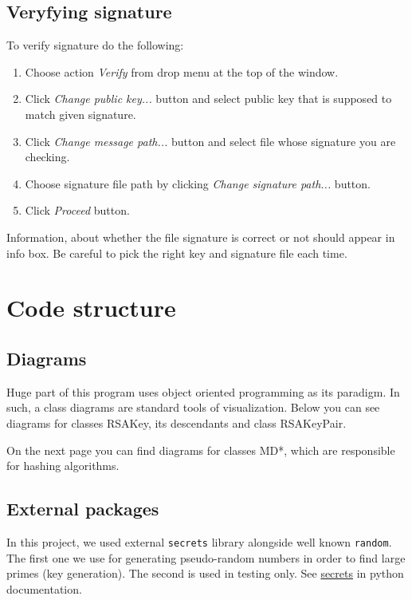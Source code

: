 \documentclass[letterpaper,10pt,english]{sphinxmanual}
\begin{document}
\section{Veryfying signature}
To verify signature do the following:
\begin{enumerate}
    \item Choose action {\em Verify} from drop menu at the top of the window.
    \item Click {\em Change public key...} button and select public key that is supposed
        to match given signature.
    \item Click {\em Change message path...} button and select file whose signature you are checking.
    \item Choose signature file path by clicking {\em Change signature path...} button.
    \item Click {\em Proceed} button.
\end{enumerate}
Information, about whether the file signature is correct or not should appear in
info box. Be careful to pick the right key and signature file each time.

\chapter{Code structure}

\section{Diagrams}
\vspace{1em}
Huge part of this program uses object oriented programming
as its paradigm. In such, a class diagrams are standard tools
of visualization. Below you can see diagrams for classes
RSAKey, its descendants and class RSAKeyPair.

On the next page you can find diagrams for classes MD*, which
are responsible for hashing algorithms.
\vspace{3em}





\section{External packages}
In this project, we used external \verb|secrets| library alongside
well known \verb|random|. The first one we use for generating
pseudo-random numbers in order to find large primes (key generation).
The second is used in testing only. See
\href{https://docs.python.org/3/library/secrets.html#module-secrets}{secrets}
in python documentation.
\end{document}
